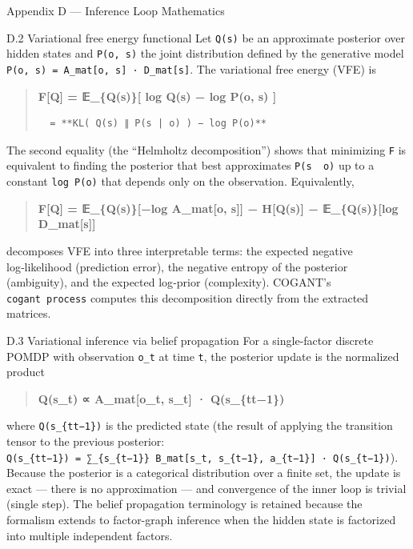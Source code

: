 \documentclass[
  ignorenonframetext,
]{beamer}
\begin{document}
\begin{frame}[fragile]{Appendix D --- Inference Loop Mathematics}
\begin{block}{D.2 Variational free energy functional}
\protect{}\label{d.2-variational-free-energy-functional}
Let \texttt{Q(s)} be an approximate posterior over hidden states and
\texttt{P(o,\ s)} the joint distribution defined by the generative model
\texttt{P(o,\ s)\ =\ A\_mat{[}o,\ s{]}\ ·\ D\_mat{[}s{]}}. The
variational free energy (VFE) is

\begin{quote}
\textbf{F{[}Q{]} = 𝔼\_\{Q(s)\}{[} log Q(s) − log P(o, s) {]}}

\begin{verbatim}
  = **KL( Q(s) ∥ P(s | o) ) − log P(o)**
\end{verbatim}
\end{quote}

The second equality (the ``Helmholtz decomposition'') shows that
minimizing \texttt{F} is equivalent to finding the posterior that best
approximates \texttt{P(s\ \textbar{}\ o)} up to a constant
\texttt{log\ P(o)} that depends only on the observation. Equivalently,

\begin{quote}
\textbf{F{[}Q{]} = 𝔼\_\{Q(s)\}{[}−log A\_mat{[}o, s{]}{]} − H{[}Q(s){]}
− 𝔼\_\{Q(s)\}{[}log D\_mat{[}s{]}{]}}
\end{quote}

decomposes VFE into three interpretable terms: the expected negative
log‑likelihood (prediction error), the negative entropy of the posterior
(ambiguity), and the expected log‑prior (complexity). COGANT's
\texttt{cogant\ process} computes this decomposition directly from the
extracted matrices.
\end{block}

\begin{block}{D.3 Variational inference via belief propagation}
\protect{}\label{d.3-variational-inference-via-belief-propagation}
For a single-factor discrete POMDP with observation \texttt{o\_t} at
time \texttt{t}, the posterior update is the normalized product

\begin{quote}
\textbf{Q(s\_t) ∝ A\_mat{[}o\_t, s\_t{]} · Q(s\_\{t\textbar t−1\})}
\end{quote}

where \texttt{Q(s\_\{t\textbar{}t−1\})} is the predicted state (the
result of applying the transition tensor to the previous posterior:
\texttt{Q(s\_\{t\textbar{}t−1\})\ =\ ∑\_\{s\_\{t−1\}\}\ B\_mat{[}s\_t,\ s\_\{t−1\},\ a\_\{t−1\}{]}\ ·\ Q(s\_\{t−1\})}).
Because the posterior is a categorical distribution over a finite set,
the update is exact --- there is no approximation --- and convergence of
the inner loop is trivial (single step). The belief propagation
terminology is retained because the formalism extends to factor-graph
inference when the hidden state is factorized into multiple independent
factors.
\end{block}


\end{frame}
\end{document}
